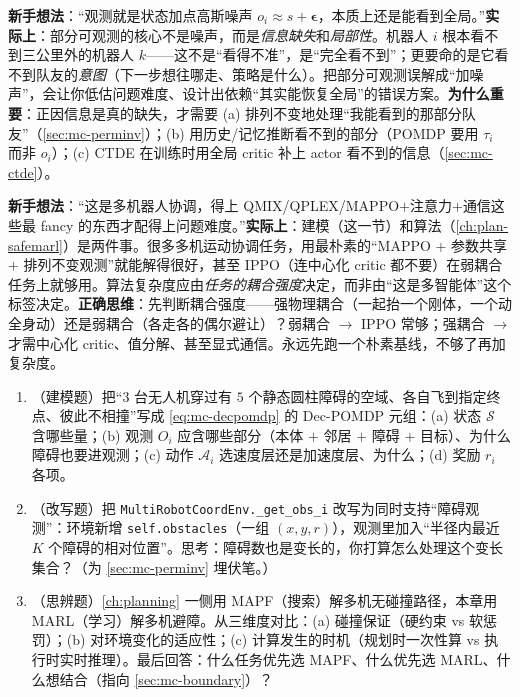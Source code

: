 \begin{pitfall}
\textbf{新手想法}：“观测就是状态加点高斯噪声 $o_i\approx s+\boldsymbol{\epsilon}$，本质上还是能看到全局。”\textbf{实际上}：部分可观测的核心不是噪声，而是\emph{信息缺失}和\emph{局部性}。机器人 $i$ 根本看不到三公里外的机器人 $k$——这不是“看得不准”，是“完全看不到”；更要命的是它看不到队友的\emph{意图}（下一步想往哪走、策略是什么）。把部分可观测误解成“加噪声”，会让你低估问题难度、设计出依赖“其实能恢复全局”的错误方案。\textbf{为什么重要}：正因信息是真的缺失，才需要 (a) 排列不变地处理“我能看到的那部分队友”（\cref{sec:mc-perminv}）；(b) 用历史/记忆推断看不到的部分（POMDP 要用 $\tau_i$ 而非 $o_i$）；(c) CTDE 在训练时用全局 critic 补上 actor 看不到的信息（\cref{sec:mc-ctde}）。
\end{pitfall}

\begin{pitfall}
\textbf{新手想法}：“这是多机器人协调，得上 QMIX/QPLEX/MAPPO$+$注意力$+$通信这些最 fancy 的东西才配得上问题难度。”\textbf{实际上}：建模（这一节）和算法（\cref{ch:plan-safemarl}）是两件事。很多多机运动协调任务，用最朴素的“MAPPO $+$ 参数共享 $+$ 排列不变观测”就能解得很好，甚至 IPPO（连中心化 critic 都不要）在弱耦合任务上就够用。算法复杂度应由\emph{任务的耦合强度}决定，而非由“这是多智能体”这个标签决定。\textbf{正确思维}：先判断耦合强度——强物理耦合（一起抬一个刚体，一个动全身动）还是弱耦合（各走各的偶尔避让）？弱耦合 $\to$ IPPO 常够；强耦合 $\to$ 才需中心化 critic、值分解、甚至显式通信。永远先跑一个朴素基线，不够了再加复杂度。
\end{pitfall}

\begin{practice}
\begin{enumerate}
  \item （建模题）把“$3$ 台无人机穿过有 $5$ 个静态圆柱障碍的空域、各自飞到指定终点、彼此不相撞”写成 \cref{eq:mc-decpomdp} 的 Dec-POMDP 元组：(a) 状态 $\mathcal{S}$ 含哪些量；(b) 观测 $O_i$ 应含哪些部分（本体 $+$ 邻居 $+$ 障碍 $+$ 目标）、为什么障碍也要进观测；(c) 动作 $\mathcal{A}_i$ 选速度层还是加速度层、为什么；(d) 奖励 $r_i$ 各项。
  \item （改写题）把 \verb|MultiRobotCoordEnv._get_obs_i| 改写为同时支持“障碍观测”：环境新增 \verb|self.obstacles|（一组 $(x,y,r)$），观测里加入“半径内最近 $K$ 个障碍的相对位置”。思考：障碍数也是变长的，你打算怎么处理这个变长集合？（为 \cref{sec:mc-perminv} 埋伏笔。）
  \item （思辨题）\cref{ch:planning} 一侧用 MAPF（搜索）解多机无碰撞路径，本章用 MARL（学习）解多机避障。从三维度对比：(a) 碰撞保证（硬约束 vs 软惩罚）；(b) 对环境变化的适应性；(c) 计算发生的时机（规划时一次性算 vs 执行时实时推理）。最后回答：什么任务优先选 MAPF、什么优先选 MARL、什么想结合（指向 \cref{sec:mc-boundary}）？
\end{enumerate}
\end{practice}

